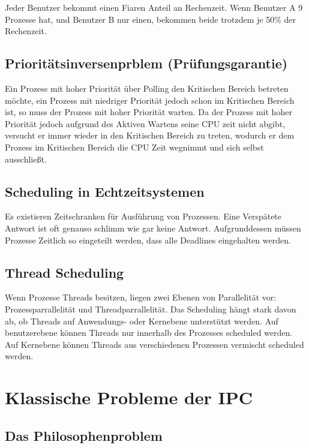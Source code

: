 Jeder Benutzer bekommt einen Fiaren Anteil an Rechenzeit. Wenn Benutzer A 9
Prozesse hat, und Benutzer B nur einen, bekommen beide trotzdem je 50\% der
Rechenzeit.

\subsection{Prioritätsinversenprblem (Prüfungsgarantie)}
\label{prioritaetsinversenproblem}

Ein Prozess mit hoher Priorität über Polling den Kritischen Bereich betreten
möchte, ein Prozess mit niedriger Priorität jedoch schon im Kritischen Bereich
ist, so muss der Prozess mit hoher Priorität warten. Da der Prozess mit hoher
Priorität jedoch aufgrund des Aktiven Wartens seine CPU zeit nicht abgibt,
versucht er immer wieder in den Kritischen Bereich zu treten, wodurch er dem
Prozess im Kritischen Bereich die CPU Zeit wegnimmt und sich selbst
ausschließt.

\subsection{Scheduling in Echtzeitsystemen}

Es existieren Zeitschranken für Ausführung von Prozessen. Eine Verspätete
Antwort ist oft genauso schlimm wie gar keine Antwort. Aufgrunddessen müssen
Prozesse Zeitlich so eingeteilt werden, dass alle Deadlines eingehalten werden.

\subsection{Thread Scheduling}

Wenn Prozesse Threads besitzen, liegen zwei Ebenen von Parallelität vor:
Prozessparrallelität und Threadparrallelität. Das Scheduling hängt stark davon
ab, ob Threads auf Anwendungs- oder Kernebene unterstützt werden. Auf
benutzerebene können Threads nur innerhalb des Prozesses scheduled werden. Auf
Kernebene können Threads aus verschiedenen Prozessen vermischt scheduled
werden.

\section{Klassische Probleme der IPC}

\subsection{Das Philosophenproblem}

